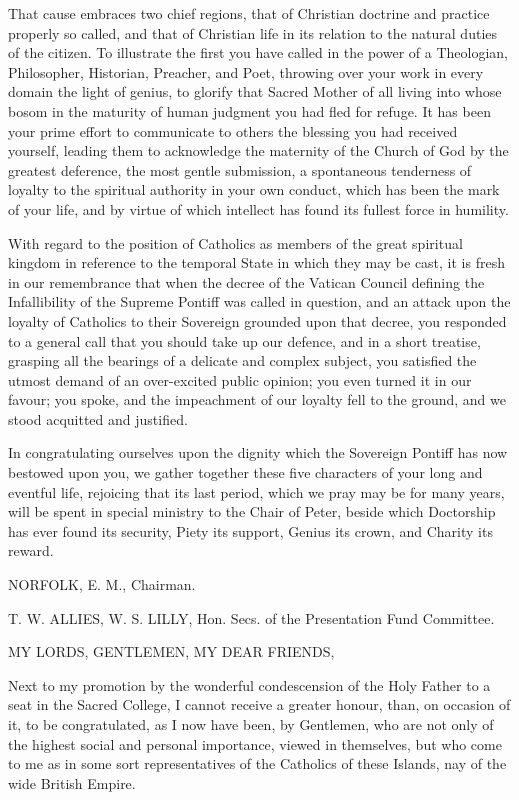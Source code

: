 That cause embraces two chief regions, that of Christian doctrine
and practice properly so called, and that of Christian life in its
relation to the natural duties of the citizen. To illustrate the first
you have called in the power of a Theologian, Philosopher, Historian,
Preacher, and Poet, throwing over your work in every domain the
light of genius, to glorify that Sacred Mother of all living into
whose bosom in the maturity of human judgment you had fled for refuge.
It has been your prime effort to communicate to others the blessing
you had received yourself, leading them to acknowledge the maternity
of the Church of God by the greatest deference, the most gentle
submission, a spontaneous tenderness of loyalty to the spiritual
authority in your own conduct, which has been the mark of your life,
and by virtue of which intellect has found its fullest force in
humility.

With regard to the position of Catholics as members of the great
spiritual kingdom in reference to the temporal State in which they may
be cast, it is fresh in our remembrance that when the decree of the
Vatican Council defining the Infallibility of the Supreme Pontiff was
called in question, and an attack upon the loyalty of Catholics to
their Sovereign grounded upon that decree, you responded to a general
call that you should take up our defence, and in a short treatise,
grasping all the bearings of a delicate and complex subject, you
satisfied the utmost demand of an over-excited public opinion; you
even turned it in our favour; you spoke, and the impeachment of our
loyalty fell to the ground, and we stood acquitted and justified.

In congratulating ourselves upon the dignity which the Sovereign
Pontiff has now bestowed upon you, we gather together these five
characters of your long and eventful life, rejoicing that its last
period, which we pray may be for many years, will be spent in special
ministry to the Chair of Peter, beside which Doctorship has ever found
its security, Piety its support, Genius its crown, and Charity its
reward.

NORFOLK, E. M., Chairman.

T. W. ALLIES, W. S. LILLY,
Hon. Secs. of the Presentation Fund Committee.


MY LORDS, GENTLEMEN,
MY DEAR FRIENDS,

Next to my promotion by the wonderful condescension of the Holy Father
to a seat in the Sacred College, I cannot receive a greater honour,
than, on occasion of it, to be congratulated, as I now have been, by
Gentlemen, who are not only of the highest social and personal
importance, viewed in themselves, but who come to me as in some sort
representatives of the Catholics of these Islands, nay of the
wide British Empire.

